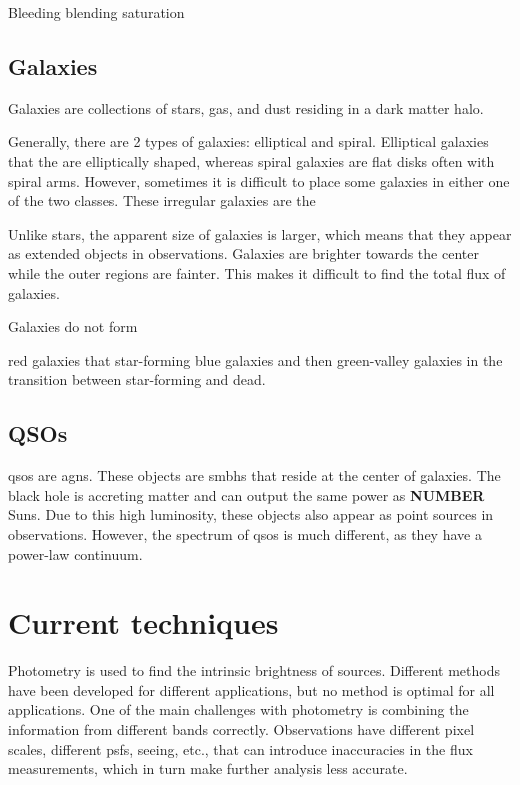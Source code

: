 Bleeding blending saturation

\subsection{Galaxies}

Galaxies are collections of stars, gas, and dust residing in a dark matter halo. 

Generally, there are 2 types of galaxies: elliptical and spiral. Elliptical galaxies that the are elliptically shaped, whereas spiral galaxies are flat disks often with spiral arms. However, sometimes it is difficult to place some galaxies in either one of the two classes. These irregular galaxies are the  

Unlike stars, the apparent size of galaxies is larger, which means that they appear as extended objects in observations. Galaxies are brighter towards the center while the outer regions are fainter. This makes it difficult to find the total flux of galaxies. 

Galaxies do not form 

red galaxies that 
star-forming blue galaxies
and then green-valley galaxies in the transition between star-forming and dead. 

\subsection{QSOs}
\glspl{qso} are \glspl{agn}. These objects are \glspl{smbh} that reside at the center of galaxies. The black hole is accreting matter and can output the same power as \textbf{NUMBER} Suns. Due to this high luminosity, these objects also appear as point sources in observations. However, the spectrum of \glspl{qso} is much different, as they have a power-law continuum. 




\section{Current techniques}

Photometry is used to find the intrinsic brightness of sources. Different methods have been developed for different applications, but no method is optimal for all applications. One of the main challenges with photometry is combining the information from different bands correctly. Observations have different pixel scales, different \glspl{psf}, seeing, etc., that can introduce inaccuracies in the flux measurements, which in turn make further analysis less accurate.

